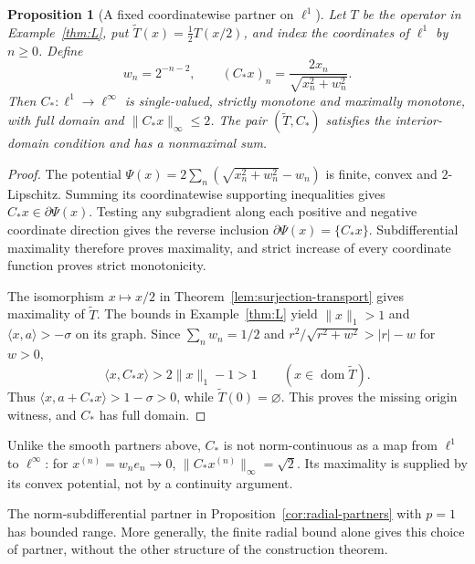 \documentclass[11pt]{article}
\newcommand{\dom}{\operatorname{dom}}
\newcommand{\pair}[2]{\langle #1,#2\rangle}
\newtheorem{proposition}{Proposition}
\theoremstyle{definition}
\theoremstyle{remark}
\begin{document}
\begin{proposition}[A fixed coordinatewise partner on $\ell^1$]
\label{cor:fixed-coordinate-partner}
Let $T$ be the operator in Example~\ref{thm:L}, put $\widetilde T(x)=\frac12T(x/2)$, and index the coordinates of $\ell^1$ by $n\ge0$. Define
\[
w_n=2^{-n-2},\qquad (C_*x)_n=\frac{2x_n}{\sqrt{x_n^2+w_n^2}}.
\]
Then $C_*:\ell^1\to\ell^\infty$ is single-valued, strictly monotone and maximally monotone, with full domain and $\|C_*x\|_\infty\le2$. The pair $(\widetilde T,C_*)$ satisfies the interior-domain condition and has a nonmaximal sum.
\end{proposition}
\begin{proof}
The potential $\Psi(x)=2\sum_n(\sqrt{x_n^2+w_n^2}-w_n)$ is finite, convex and $2$-Lipschitz. Summing its coordinatewise supporting inequalities gives $C_*x\in\partial\Psi(x)$. Testing any subgradient along each positive and negative coordinate direction gives the reverse inclusion $\partial\Psi(x)=\{C_*x\}$. Subdifferential maximality therefore proves maximality, and strict increase of every coordinate function proves strict monotonicity.

The isomorphism $x\mapsto x/2$ in Theorem~\ref{lem:surjection-transport} gives maximality of $\widetilde T$. The bounds in Example~\ref{thm:L} yield $\|x\|_1>1$ and $\pair{x}{a}>-\sigma$ on its graph. Since $\sum_nw_n=1/2$ and $r^2/\sqrt{r^2+w^2}>|r|-w$ for $w>0$,
\[
\pair{x}{C_*x}>2\|x\|_1-1>1\qquad(x\in\dom\widetilde T).
\]
Thus $\pair{x}{a+C_*x}>1-\sigma>0$, while $\widetilde T(0)=\varnothing$. This proves the missing origin witness, and $C_*$ has full domain.
\end{proof}

Unlike the smooth partners above, $C_*$ is not norm-continuous as a map from $\ell^1$ to $\ell^\infty$: for $x^{(n)}=w_ne_n\to0$, $\|C_*x^{(n)}\|_\infty=\sqrt2$. Its maximality is supplied by its convex potential, not by a continuity argument.

The norm-subdifferential partner in Proposition~\ref{cor:radial-partners} with $p=1$ has bounded range. More generally, the finite radial bound alone gives this choice of partner, without the other structure of the construction theorem.
\end{document}
